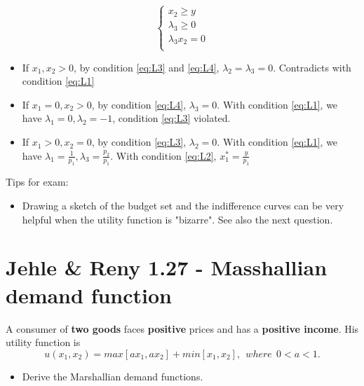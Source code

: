 \documentclass{article}
\begin{document}
\begin{mdframed}[backgroundcolor=blue!20,linecolor=white]
\begin{equation}
  \begin{cases}
    x_2 \ge y \\
    \lambda_3 \ge 0 \\
    \lambda_3 x_2 =0 \\
  \end{cases}
   \label{eq:L4}
\end{equation}

\begin{itemize}
\item If $x_1,x_2>0$, by condition \ref{eq:L3} and \ref{eq:L4}, $\lambda_2 = \lambda_3 =0$.
Contradicts with condition \ref{eq:L1}

\item If $x_1=0,x_2>0$, by condition \ref{eq:L4}, $\lambda_3 =0$.
With condition \ref{eq:L1}, we have $\lambda_1 =0, \lambda_2 = -1$, condition \ref{eq:L3} violated.

\item If $x_1>0,x_2=0$, by condition \ref{eq:L3}, $\lambda_2 =0$.
With condition \ref{eq:L1}, we have $\lambda_1 =\frac{1}{p_1}, \lambda_3 = \frac{p_2}{p_1}$.
With condition \ref{eq:L2}, $x_1^* = \frac{y}{p_1}$
\end{itemize}
\end{mdframed}

\begin{mdframed}[backgroundcolor=yellow!20,linecolor=white]
Tips for exam:
\begin{itemize}

\item Drawing a sketch of the budget set and the indifference curves can be very helpful when the utility 
function is "bizarre". See also the next question.

\end{itemize}

\end{mdframed}

\section{Jehle \& Reny 1.27 - Masshallian demand function}

A consumer of \textbf{two goods} faces \textbf{positive} prices and has a \textbf{positive income}. 
His utility function is $$u(x_1, x_2) = max[ax_1, ax_2] + min[x_1, x_2], \ \ where \ \ 0 < a < 1.$$
\begin{itemize}
\item Derive the Marshallian demand functions.
\end{itemize}
\end{document}
